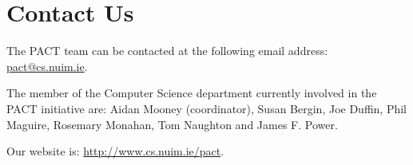 \documentclass[a4paper]{article}
\begin{document}
\section{Contact Us} \label{Sect:ContactUs}
The PACT team can be contacted at the following email address: \url{pact@cs.nuim.ie}.

The member of the Computer Science department currently involved in the PACT initiative are:
Aidan Mooney (coordinator),
Susan Bergin,
Joe Duffin,
Phil Maguire,
Rosemary Monahan,
Tom Naughton and
James F. Power. 




Our website is: \url{http://www.cs.nuim.ie/pact}.


\end{document}
